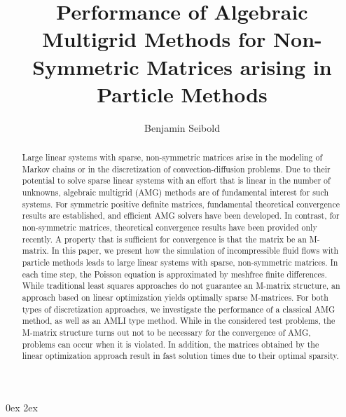 \documentclass[reqno]{amsart}
\theoremstyle{plain}
\theoremstyle{definition}
\theoremstyle{remark}
\begin{document}
\parindent0ex
\parskip2ex

\title[Performance of AMG for Non-Symmetric Matrices]
{Performance of Algebraic Multigrid Methods
for Non-Symmetric Matrices arising in Particle Methods}
\author{Benjamin Seibold}
\address{Department of Mathematics \\ Temple University \\
1801 N.~Broad Street \\ Philadelphia, PA 19122}
\begin{abstract}
Large linear systems with sparse, non-symmetric matrices arise in the modeling of
Markov chains or in the discretization of convection-diffusion problems. Due to their
potential to solve sparse linear systems with an effort that is linear in the number
of unknowns, algebraic multigrid (AMG) methods are of fundamental interest for such
systems. For symmetric positive definite matrices, fundamental theoretical convergence
results are established, and efficient AMG solvers have been developed.
In contrast, for non-symmetric matrices, theoretical convergence results have been
provided only recently. A property that is sufficient for convergence is that the
matrix be an M-matrix.
In this paper, we present how the simulation of incompressible fluid flows with
particle methods leads to large linear systems with sparse, non-symmetric matrices.
In each time step, the Poisson equation is approximated by meshfree finite differences.
While traditional least squares approaches do not guarantee an M-matrix structure,
an approach based on linear optimization yields optimally sparse M-matrices.
For both types of discretization approaches, we investigate the performance of a
classical AMG method, as well as an AMLI type method.
While in the considered test problems, the M-matrix structure turns out not to be
necessary for the convergence of AMG, problems can occur when it is violated. In
addition, the matrices obtained by the linear optimization approach result in fast
solution times due to their optimal sparsity.
\end{abstract}

\maketitle
\end{document}
